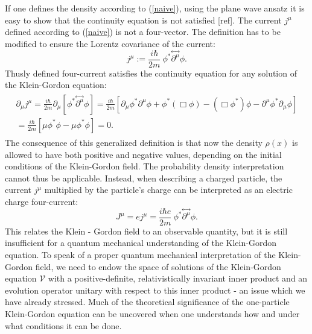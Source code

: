 \documentclass[11pt]{article}
\def\dvec#1{\overset{\leftrightarrow}{#1}}
\numberwithin{equation}{section}
\begin{document}
      If one defines the density according to (\ref{naive}), using the plane wave ansatz it is easy to show that the continuity equation is not satisfied [ref].
      The current $j^\mu$ defined according to (\ref{naive}) is not a four-vector. 
      The definition has to be modified to ensure the Lorentz covariance of the current:
      \begin{equation}
        j^\mu := \frac{i \hbar}{2m} \ \phi^* \dvec{\partial^\mu} \phi.
      \end{equation}
      Thusly defined four-current satisfies the continuity equation for any solution of the Klein-Gordon equation:
      \begin{gather}
        \begin{gathered}
        \partial_\mu j^\mu = \frac{i \hbar}{2m} \partial_\mu \left[\phi^* \dvec{\partial^\mu} \phi \right]
        = \frac{i \hbar}{2m} \left[ \partial_\mu \phi^* \partial^\mu \phi + \phi^* ( \Box \phi ) - ( \Box \phi^* ) \phi - \partial^\mu \phi^* \partial_\mu \phi \right]\\
        = \frac{i \hbar}{2m} \left[ \mu \phi^* \phi - \mu \phi^* \phi \right] = 0.
        \end{gathered}
      \end{gather}
      The consequence of this generalized definition is that now the density $\rho(x)$ is allowed to have both positive and
      negative values, depending on the initial conditions of the Klein-Gordon field. The probability density interpretation
      cannot thus be applicable. Instead, when describing a charged particle, the current $j^\mu$ multiplied by the particle's charge
      can be interpreted as an electric charge four-current:
      \begin{equation}
        J^\mu = e j^\mu = \frac{i \hbar e}{2m} \ \phi^* \dvec{\partial^\mu} \phi.
      \end{equation} 
      This relates the Klein - Gordon field to an observable quantity, but it is still insufficient for a quantum mechanical understanding of the Klein-Gordon equation.
      To speak of a proper quantum mechanical interpretation of the Klein-Gordon field, we need to endow the space of solutions of the Klein-Gordon equation $\mathcal{V}$ with
      a positive-definite, relativistically invariant inner product and an evolution operator unitary with respect to this inner product - an issue which we have already stressed.
      Much of the theoretical significance of the one-particle Klein-Gordon equation can be uncovered when one understands how and under what conditions it can be done.
      
\end{document}
